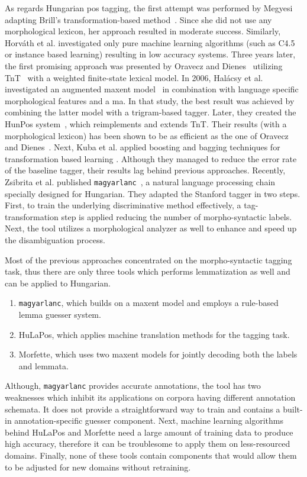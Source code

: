 As regards Hungarian \gls{pos} tagging, the first attempt was performed by Megyesi~\cite{Megyesi1998} adapting Brill’s transformation-based method~\cite{Brill1992}. 
Since she did not use any morphological lexicon, her approach resulted in moderate success.
Similarly, Horváth et al. investigated \cite{Horvath1999} only pure machine learning algorithms (such as C4.5 or instance based learning) resulting in low accuracy systems.
Three years later, the first promising approach was presented by Oravecz and Dienes~\cite{Oravecz2002a} utilizing TnT~\cite{Brants2000} with a weighted finite-state lexical model.
In 2006, Halácsy et al. investigated an augmented \acrshort{maxent} model~\cite{Halacsy2006} in combination with language specific morphological features and a \acrshort{ma}.
In that study, the best result was achieved by combining the latter model with a trigram-based tagger.
Later, they created the HunPos system~\cite{Halacsy2007}, which reimplements and extends TnT.
Their results (with a morphological lexicon) has been shown to be as efficient as the one of Oravecz and Dienes~\cite{Oravecz2002a}.
Next, Kuba et al. applied boosting and bagging techniques for transformation based learning \cite{Kuba2004}.
Although they managed to reduce the error rate of the baseline tagger, their results lag behind previous approaches.
Recently, Zsibrita et al. published \texttt{magyarlanc}~\cite{zsibrata2013magyarlanc}, a natural language processing chain specially designed for Hungarian.
They adapted the Stanford tagger \cite{Toutanova2003} in two steps. 
First, to train the underlying discriminative method effectively, a tag-transformation step is applied reducing the number of morpho-syntactic labels.
Next, the tool utilizes a morphological analyzer as well to enhance and speed up the disambiguation process.

Most of the previous approaches concentrated on the morpho-syntactic tagging task, thus there are only three tools which performs lemmatization as well and can be applied to Hungarian.
\begin{enumerate}
	\item \texttt{magyarlanc}, which builds on a \acrshort{maxent} model and employs a rule-based lemma guesser system.
	\item HuLaPos, which applies machine translation methods for the tagging task. 
	\item Morfette, which uses two \acrlong{maxent} models for jointly decoding both the labels and lemmata.
\end{enumerate}
Although, \texttt{magyarlanc} provides accurate annotations, the tool has two weaknesses which inhibit its applications on corpora having different annotation schemata. 
It does not provide a straightforward way to train and contains a built-in annotation-specific guesser component.
Next, machine learning algorithms behind HuLaPos and Morfette need a large amount of training data to produce high accuracy, therefore it can be troublesome to apply them on less-resourced domains.
Finally, none of these tools contain components that would allow them to be adjusted for new domains without retraining.

